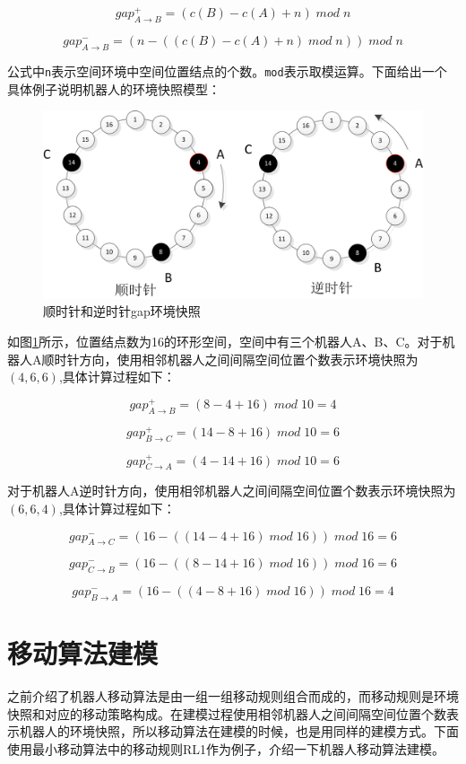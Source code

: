 $$gap_{A \rightarrow B}^+ = \left(c \left( B \right) - c \left( A \right) + n\right) \;  mod \; n $$

$$gap_{A \rightarrow B}^- = \left(n - \left( \left( c \left( B \right) -  c \left( A \right) +n\right) \; mod \; n \right) \right) \; mod \; n $$

公式中\verb|n|表示空间环境中空间位置结点的个数。\verb|mod|表示取模运算。下面给出一个具体例子说明机器人的环境快照模型：

\begin{figure}[!hbt]
	\centering
	\includegraphics[width=3 in]{fig/gapexpress.png}
	\caption{顺时针和逆时针gap环境快照}
	\label{fig:gapexpress}
\end{figure}

如图\ref{fig:gapexpress}所示，位置结点数为16的环形空间，空间中有三个机器人A、B、C。对于机器人A顺时针方向，使用相邻机器人之间间隔空间位置个数表示环境快照为$\left(4,6,6\right)$,具体计算过程如下：

$$gap_{A \rightarrow B}^+ = \left(8 - 4 + 16\right) \;  mod \; 10 = 4$$

$$gap_{B \rightarrow C}^+ = \left(14 - 8 + 16\right) \;  mod \; 10 = 6$$

$$gap_{C \rightarrow A}^+ = \left(4 - 14 + 16\right) \;  mod \; 10 = 6$$


对于机器人A逆时针方向，使用相邻机器人之间间隔空间位置个数表示环境快照为$\left(6,6,4\right)$,具体计算过程如下：

$$gap_{A \rightarrow C}^- = \left(16 - \left( \left( 14 -  4 + 16\right) \; mod \; 16 \right) \right) \; mod \; 16 = 6 $$

$$gap_{C \rightarrow B}^- = \left(16 - \left( \left( 8 -  14 + 16\right) \; mod \; 16 \right) \right) \; mod \; 16 = 6 $$

$$gap_{B \rightarrow A}^- = \left(16 - \left( \left( 4 -  8  + 16  \right) \; mod \; 16 \right) \right) \; mod \; 16 = 4$$

\section{移动算法建模}
之前介绍了机器人移动算法是由一组一组移动规则组合而成的，而移动规则是环境快照和对应的移动策略构成。在建模过程使用相邻机器人之间间隔空间位置个数表示机器人的环境快照，所以移动算法在建模的时候，也是用同样的建模方式。下面使用最小移动算法中的移动规则RL1作为例子，介绍一下机器人移动算法建模。

